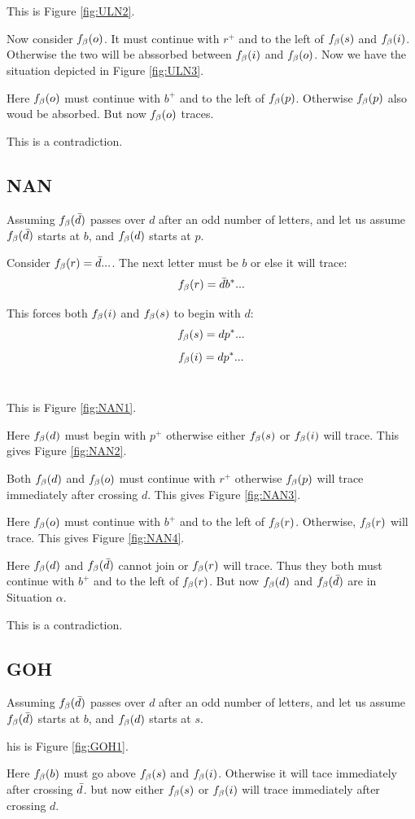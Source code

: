 This is Figure \ref{fig:ULN2}.

Now consider $f_\beta(o)$. It must continue with $r^+$ and to the left of $f_\beta(s)$ and $f_\beta(i)$. Otherwise the two will be abssorbed between $f_\beta(i)$ and $f_\beta(o)$. Now we have the situation depicted in Figure \ref{fig:ULN3}.

Here $f_\beta(o)$ must continue with $b^+$ and to the left of $f_\beta(p)$. Otherwise $f_\beta(p)$ also woud be absorbed. But now $f_\beta(o)$ traces. 

This is a contradiction.

\subsection{NAN}\label{NAN}
Assuming $f_\beta(\bar{d})$ passes over $d$ after an odd number of letters, and let us assume $f_\beta(\bar{d})$ starts at $b$, and $f_\beta(d)$ starts at $p$.

Consider $f_\beta(r) = \bar{d}...$. The next letter must be $b$ or else it will trace:
\[
f_\beta(r) = \bar{d} b^*...
\]

This forces both $f_\beta(i)$ and $f_\beta(s)$ to begin with $d$:
\[
f_\beta(s) = d p^*...
\]
\[
f_\beta(i) = d p^*...
\]\

This is Figure \ref{fig:NAN1}.

Here $f_\beta(d)$ must begin with $p^+$ otherwise either $f_\beta(s)$ or $f_\beta(i)$ will trace. This gives Figure \ref{fig:NAN2}.

Both $f_\beta(d)$ and $f_\beta(o)$ must continue with $r^+$ otherwise $f_\beta(p)$ will trace immediately after crossing $d$. This gives Figure \ref{fig:NAN3}.

Here $f_\beta(o)$ must continue with $b^+$ and to the left of $f_\beta(r)$. Otherwise, $f_\beta(r)$ will trace. This gives Figure \ref{fig:NAN4}.

Here $f_\beta(d)$ and $f_\beta(\bar{d})$ cannot join or $f_\beta(r)$ will trace. Thus they both must continue with $b^+$ and to the left of $f_\beta(r)$. But now $f_\beta(d)$ and $f_\beta(\bar{d})$ are in Situation $\alpha$. 

This is a contradiction.

\subsection{GOH}\label{GOH}
Assuming $f_\beta(\bar{d})$ passes over $d$ after an odd number of letters, and let us assume $f_\beta(\bar{d})$ starts at $b$, and $f_\beta(d)$ starts at $s$.

his is Figure \ref{fig:GOH1}.

Here $f_\beta(b)$ must go above $f_\beta(s)$ and $f_\beta(i)$. Otherwise it will tace immediately after crossing $\bar{d}$. but now either $f_\beta(s)$ or $f_\beta(i)$ will trace immediately after crossing $d$.

